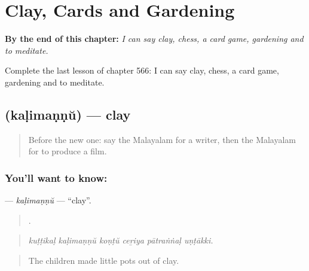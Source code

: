 
\chapter{Clay, Cards and Gardening}
\label{ch:ml-clay-cards-and-gardening}

\begin{chapteropening}
\textbf{By the end of this chapter:} \emph{I can say clay, chess, a card game, gardening and to meditate.}

Complete the last lesson of chapter 566: I can say clay, chess, a card game, gardening and to meditate.
\end{chapteropening}

\section[\texorpdfstring{\ml{കളിമണ്ണ്} (kaḷimaṇṇŭ)}{കളിമണ്ണ് (kaḷimaṇṇŭ)}]{ (kaḷimaṇṇŭ) — clay}

\label{lesson:ML-C566-kalimannu}



\begin{quote}
Before the new one: say the Malayalam for a writer, then the Malayalam for to produce a film.
\end{quote}

\subsection*{You'll want to know: }
\textbf{} — \emph{kaḷimaṇṇŭ} — \textquotedblleft{}clay\textquotedblright{}.

\begin{quote}
     .
\end{quote}

\begin{quote}
\emph{kuṭṭikaḷ kaḷimaṇṇŭ koṇṭŭ ceṟiya pātraṅṅaḷ uṇṭākki.}
\end{quote}

\begin{quote}
The children made little pots out of clay.
\end{quote}

